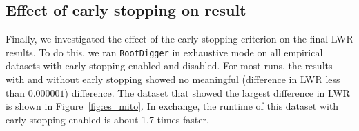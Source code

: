 \documentclass{article}
\newcommand{\RootDiggertt}{\texttt{RootDigger}}
\begin{document}

\subsection{Effect of early stopping on result}

Finally, we investigated the effect of the early stopping criterion on the final
LWR results. To do this, we ran \RootDiggertt{} in exhaustive mode on all
empirical datasets with early stopping enabled and disabled. For most runs, the
results with and without early stopping showed no meaningful (difference in LWR
less than $0.000001$) difference. The dataset that showed the largest difference
in LWR is shown in Figure~\ref{fig:es_mito}. In exchange, the runtime of this
dataset with early stopping enabled is about 1.7 times faster.
\end{document}
